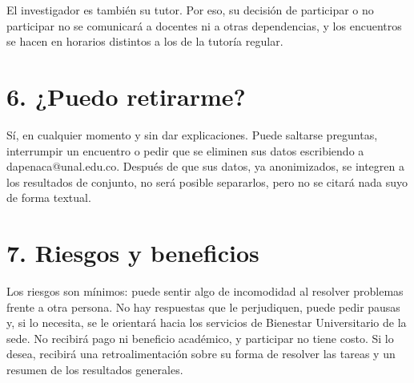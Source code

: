 \documentclass[11pt,letterpaper]{article}
\makeatletter
\newcommand{\CorreoInv}{dapenaca@unal.edu.co}
\makeatother
\begin{document}
El investigador es también su tutor. Por eso, su decisión de participar o no participar no se comunicará a docentes ni a otras dependencias, y los encuentros se hacen en horarios distintos a los de la tutoría regular.

\section*{6. ¿Puedo retirarme?}
Sí, en cualquier momento y sin dar explicaciones. Puede saltarse preguntas, interrumpir un encuentro o pedir que se eliminen sus datos escribiendo a \CorreoInv. Después de que sus datos, ya anonimizados, se integren a los resultados de conjunto, no será posible separarlos, pero no se citará nada suyo de forma textual.

\section*{7. Riesgos y beneficios}
Los riesgos son mínimos: puede sentir algo de incomodidad al resolver problemas frente a otra persona. No hay respuestas que le perjudiquen, puede pedir pausas y, si lo necesita, se le orientará hacia los servicios de Bienestar Universitario de la sede. No recibirá pago ni beneficio académico, y participar no tiene costo. Si lo desea, recibirá una retroalimentación sobre su forma de resolver las tareas y un resumen de los resultados generales.
\end{document}
